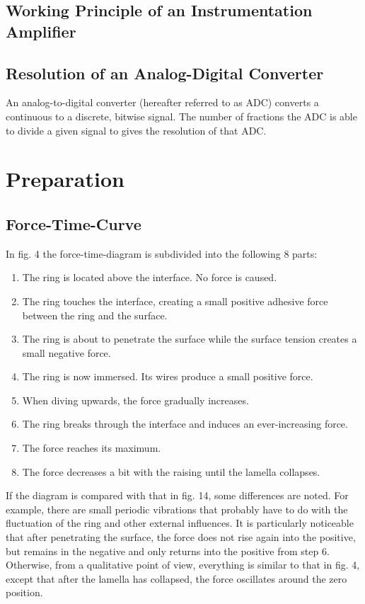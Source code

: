         \subsection*{Working Principle of an Instrumentation Amplifier}
        \subsection*{Resolution of an Analog-Digital Converter}
        An analog-to-digital converter (hereafter referred to as ADC) converts a continuous to a discrete, bitwise signal.
        The number of fractions the ADC is able to divide a given signal to gives the resolution of that ADC.
    \section{Preparation}
        \subsection*{Force-Time-Curve}\label{sec:A1 force time curve}%
            In fig. 4 the force-time-diagram is subdivided into the following 8 parts:
            \begin{enumerate}
                \item The ring is located above the interface. No force is caused.
                \item The ring touches the interface, creating a small positive adhesive force between the ring and the surface.
                \item The ring is about to penetrate the surface while the surface tension creates a small negative force.
                \item The ring is now immersed. Its wires produce a small positive force.
                \item When diving upwards, the force gradually increases.
                \item The ring breaks through the interface and induces an ever-increasing force.
                \item The force reaches its maximum.
                \item The force decreases a bit with the raising until the lamella collapses.
            \end{enumerate}
            If the diagram is compared with that in fig. 14, some differences are noted. For example, there are small
            periodic vibrations that probably have to do with the fluctuation of the ring and other external influences.
            It is particularly noticeable that after penetrating the surface, the force does not rise again into the
            positive, but remains in the negative and only returns into the positive from step 6. Otherwise, from a
            qualitative point of view, everything is similar to that in fig. 4, except that after the lamella has
            collapsed, the force oscillates around the zero position.
